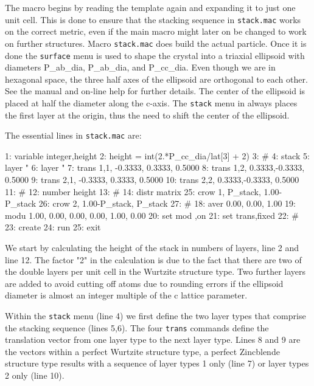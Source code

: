 The macro begins by reading the template again and expanding it to just one 
unit cell. This is done to ensure that the stacking sequence in {\tt stack.mac}
works on the correct metric, even if the main macro might later on be changed to
work on further structures. Macro {\tt stack.mac} does build the actual 
particle. Once it is done the {\tt surface} menu is used to shape the 
crystal into a triaxial ellipsoid with diameters P\_ab\_dia, P\_ab\_dia,
and P\_cc\_dia. Even though we are in hexagonal space, the three half axes
of the ellipsoid are orthogonal to each other. See the \Discus manual 
and on-line help for further details.  The center of the ellipsoid is placed
at half the diameter along the c-axis. The {\tt stack} menu in \Discus
always places the first layer at the origin, thus the need to shift the 
center of the ellipsoid.

The essential lines in {\tt stack.mac} are:

\begin{MacVerbatim}
 1: variable integer,height
 2: height = int(2.*P_cc_dia/lat[3] + 2)
 3: #
 4: stack
 5:    layer "%
 6:    layer "%
 7:    trans  1,1, -0.3333, 0.3333, 0.5000
 8:    trans  1,2,  0.3333,-0.3333, 0.5000
 9:    trans  2,1, -0.3333, 0.3333, 0.5000
10:    trans  2,2,  0.3333,-0.3333, 0.5000
11: #
12:    number height
13: #
14:    distr  matrix
25:    crow   1,       P_stack, 1.00-P_stack
26:    crow   2,  1.00-P_stack,      P_stack
27: #
18:    aver   0.00, 0.00, 1.00
19:    modu   1.00, 0.00, 0.00,  0.00, 1.00, 0.00
20:    set mod ,on
21:    set trans,fixed
22: #
23:   create
24:   run
25: exit
\end{MacVerbatim}

We start by calculating the height of the stack in numbers of layers,
line 2 and line 12.  The factor "2" in the calculation is due to the fact 
that there are two of the double layers per unit cell in the Wurtzite 
structure type. Two further layers are added to avoid cutting off atoms 
due to rounding errors if the ellipsoid diameter is almost an integer 
multiple of the c lattice parameter. 

Within the {\tt stack} menu (line 4) we first define the two layer types
that comprise the stacking sequence (lines 5,6). The four {\tt trans}
commands define the translation vector from one layer type to the
next layer type. Lines 8 and 9 are the vectors within a perfect Wurtzite
structure type, a perfect Zincblende structure type results with a 
sequence of layer types 1 only (line 7) or layer types 2 only (line 10).  

